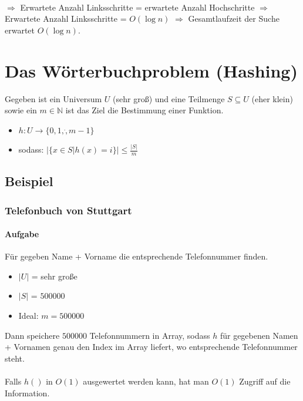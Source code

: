 \paragraph*{} $\Rightarrow$ Erwartete Anzahl Linksschritte = erwartete Anzahl Hochschritte
$\Rightarrow$ Erwartete Anzahl Linksschritte = $O(\log n)$
$\Rightarrow$ Gesamtlaufzeit der Suche erwartet $O(\log n)$. %

\section{Das Wörterbuchproblem (Hashing)}
Gegeben ist ein Universum $U$ (sehr groß) und eine Teilmenge $S \subseteq U$ (eher klein) sowie ein $m \in \mathbb{N}$ ist das Ziel die Bestimmung einer Funktion.
\begin{itemize}
	\item[] $h : U \rightarrow \{ 0,1,\dot,m-1 \}$
	\item[]sodass: $\big| \{ x \in S | h(x) =i \} \big| \leq \frac{|S|}{m}$ %
\end{itemize}

\subsection{Beispiel}
\subsubsection*{Telefonbuch von Stuttgart}
\paragraph*{Aufgabe} Für gegeben Name + Vorname die entsprechende Telefonnummer finden.
\begin{itemize}
	\item $|U|$ = sehr große
	\item $|S|$ = $500 000$
	\item Ideal: $m = 500 000$
\end{itemize}
Dann speichere $500 000$ Telefonnummern in Array, sodass $h$ für gegebenen Namen + Vornamen genau den Index im Array liefert, wo entsprechende Telefonnummer steht.

\paragraph*{} Falls $h()$ in $O(1)$ ausgewertet werden kann, hat man $O(1)$ Zugriff auf die Information.